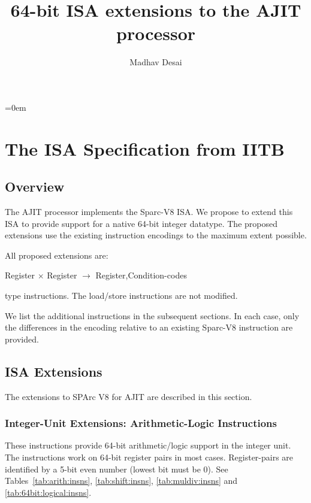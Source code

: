 \documentclass{book}
\begin{document}
\title{64-bit ISA extensions to the AJIT processor}
\author{Madhav Desai}
\maketitle
\newpage
\parskip=0em
\tableofcontents
\newpage
\listoftables
\newpage
\parskip 0.1in

\chapter{The ISA Specification from IITB}
\label{chap:from:mpd:at:iitb}

\section{Overview}
\label{sec:Overview}

The AJIT processor implements the  Sparc-V8 ISA.  We propose to extend
this ISA to provide support for a native 64-bit integer datatype.  The
proposed  extensions use  the  existing instruction  encodings to  the
maximum extent possible.

All proposed extensions are:

\centerline{Register $\times$ Register $\rightarrow$ Register,Condition-codes}

type instructions.  The load/store instructions are not modified.

We list  the additional instructions  in the subsequent  sections.  In
each  case,  only the  differences  in  the  encoding relative  to  an
existing Sparc-V8 instruction are provided.

\newpage
\section{ISA Extensions}
\label{sec:isa:extns}

The extensions to SPArc V8 for AJIT are described in this section.

\subsection{Integer-Unit Extensions: Arithmetic-Logic Instructions}
\label{sec:integer-unit-extns:arith-logic-insns}

These  instructions provide  64-bit  arithmetic/logic  support in  the
integer unit.  The instructions work  on 64-bit register pairs in most
cases.  Register-pairs are  identified by a 5-bit  even number (lowest
bit     must     be     0).      See     Tables~\ref{tab:arith:insns},
\ref{tab:shift:insns},            \ref{tab:muldiv:insns}           and
\ref{tab:64bit:logical:insns}.
\end{document}
